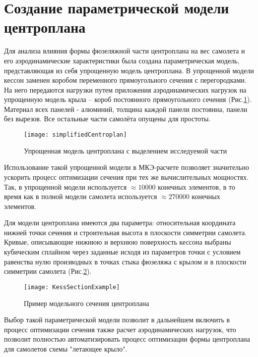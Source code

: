\section{Создание параметрической модели центроплана}
\label{sec:creationOfModel}

Для анализа влияния формы фюзеляжной части центроплана на вес самолета и его аэродинамические характеристики была создана параметрическая модель, представляющая из себя упрощенную модель центроплана. В упрощенной модели кессон заменен коробом переменного прямоугольного сечения с перегородками. На него передаются нагрузки путем приложения аэродинамических нагрузок на упрощенную модель крыла -- короб постоянного прямоугольного сечения (Рис.\ref{fig:CurvedKessonPatran}). Материал всех панелей - алюминий, толщина каждой панели постоянна, панели без вырезов. Все остальные части самолёта опущены для простоты.  



\begin{figure}[ht]
\centering
\texttt{[image: simplifiedCentroplan]}
\caption{Упрощенная модель центроплана с выделением исследуемой части}
\label{fig:CurvedKessonPatran}
\end{figure}

Использование такой упрощенной модели в МКЭ-расчете позволяет значительно ускорить процесс оптимизации сечения при тех же вычислительных мощностях. Так, в упрощенной модели используется $\approx10000$ конечных элементов, в то время как в полной модели самолета используется $\approx270000$ конечных элементов.

Для модели центроплана имеются два параметра: относительная координата нижней точки сечения и строительная высота в плоскости симметрии самолета. Кривые, описывающие нижнюю и верхнюю поверхность кессона выбраны кубическим сплайном через заданные исходя из параметров точки с условием равенства нулю производных в точках стыка фюзеляжа с крылом и в плоскости симметрии самолета (Рис.\ref{fig:KessSectionExample}).

\begin{figure}[ht]
\centering
\texttt{[image: KessSectionExample]}
%
\caption{Пример модельного сечения центроплана}
\label{fig:KessSectionExample}
\end{figure}


Выбор такой параметрической модели позволит в дальнейшем включить в процесс оптимизации сечения также расчет аэродинамических нагрузок, что позволит полностью автоматизировать процесс оптимизации формы центроплана для самолетов схемы "летающее крыло". 

